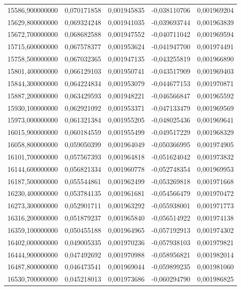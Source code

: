 \begin{longtable}{rrrrr}
15586,900000000 & 0,070171858 & 0,001945835 & -0,038110706 & 0,001969204\\
15629,800000000 & 0,069324248 & 0,001941035 & -0,039693744 & 0,001963839\\
15672,700000000 & 0,068682588 & 0,001947552 & -0,040711042 & 0,001969594\\
15715,600000000 & 0,067578377 & 0,001953624 & -0,041947700 & 0,001974491\\
15758,500000000 & 0,067032365 & 0,001947135 & -0,043255819 & 0,001966890\\
15801,400000000 & 0,066129103 & 0,001950741 & -0,043517909 & 0,001969403\\
15844,300000000 & 0,064224834 & 0,001953079 & -0,044677153 & 0,001970871\\
15887,200000000 & 0,063429593 & 0,001948221 & -0,046566847 & 0,001965592\\
15930,100000000 & 0,062921092 & 0,001953371 & -0,047133479 & 0,001969569\\
15973,000000000 & 0,061321384 & 0,001955205 & -0,048025436 & 0,001969641\\
16015,900000000 & 0,060184559 & 0,001955499 & -0,049517229 & 0,001968329\\
16058,800000000 & 0,059050399 & 0,001964049 & -0,050366995 & 0,001974905\\
16101,700000000 & 0,057567393 & 0,001964818 & -0,051624042 & 0,001973832\\
16144,600000000 & 0,056821334 & 0,001960778 & -0,052748354 & 0,001969953\\
16187,500000000 & 0,055544861 & 0,001962499 & -0,053269818 & 0,001971668\\
16230,400000000 & 0,053784135 & 0,001961681 & -0,054566479 & 0,001970472\\
16273,300000000 & 0,052901711 & 0,001963292 & -0,055938001 & 0,001971773\\
16316,200000000 & 0,051879237 & 0,001965840 & -0,056514922 & 0,001974138\\
16359,100000000 & 0,050455188 & 0,001964965 & -0,057192913 & 0,001974302\\
16402,000000000 & 0,049005335 & 0,001970236 & -0,057938103 & 0,001979821\\
16444,900000000 & 0,047492692 & 0,001970988 & -0,058956821 & 0,001982014\\
16487,800000000 & 0,046473541 & 0,001969044 & -0,059899235 & 0,001981060\\
16530,700000000 & 0,045218013 & 0,001973686 & -0,060294790 & 0,001986825\\

\end{longtable}
